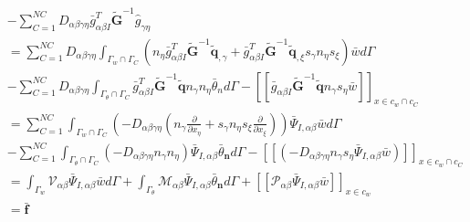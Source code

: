 \begin{equation}
 \begin{split}
    &-\sum_{C=1}^{N\!C}D_{\alpha\beta\gamma\eta}\bar{g}_{\alpha\beta I}^T\tilde{\pmb G}^{-1}\hat{g}_{\gamma\eta }\\
    &=\sum_{C=1}^{N\!C}D_{\alpha\beta\gamma\eta}\int_{{\Gamma_w}\cap{\Gamma_C}}(n_{\eta}
    \bar{g}_{\alpha\beta I}^T\tilde{\pmb G}^{-1}\tilde{\pmb q}_{,\gamma}+\bar{g}_{\alpha\beta I}^T
    \tilde{\pmb G}^{-1}\tilde{\pmb q}_{,\xi}s_{\gamma}n_{\eta}s_{\xi})\bar{w}d\Gamma\\
    &-\sum_{C=1}^{N\!C}D_{\alpha\beta\gamma\eta}\int_{{\Gamma_{\theta}}\cap{\Gamma_{C}}}\bar{g}^T_{\alpha\beta I}\tilde{\pmb G}^{-1}\tilde{\pmb q}n_{\gamma}n_{\eta}\bar{\theta}_nd\Gamma-[[\bar{g}_{\alpha\beta I}\tilde{\pmb G}^{-1}\tilde{\pmb q}n_{\gamma}s_{\eta}\bar{w}]]_{x\in{c_w}\cap{c_C}}\\
    &=\sum_{C=1}^{N\!C}\int_{{\Gamma_w}\cap{\Gamma_C}}(-D_{\alpha\beta\gamma\eta}(n_{\gamma}\frac{\partial}{\partial x_{\eta}}+s_{\gamma}n_{\eta}s_{\xi}\frac{\partial}{\partial x_{\xi}}))\bar{\Psi}_{I,\alpha\beta}\bar{w}d\Gamma\\
    &-\sum_{C=1}^{N\!C}\int_{{\Gamma_{\theta}}\cap{\Gamma_C}}(-D_{\alpha\beta\gamma\eta}n_{\gamma}n_{\eta})\bar{\Psi}_{I,\alpha\beta}\bar{\theta}_{\pmb n}d\Gamma-[[(-D_{\alpha\beta\gamma\eta}n_{\gamma}s_{\eta}\bar{\Psi}_{I,\alpha\beta}\bar{w})]]_{x\in{c_w}\cap{c_C}}\\
    &=\int_{\Gamma_w}\mathcal{V}_{\alpha\beta}\bar{\Psi}_{I,\alpha\beta}\bar{w}d\Gamma+\int_{\Gamma_{\theta}}\mathcal{M}_{\alpha\beta}\bar{\Psi}_{I,\alpha\beta}\bar{\theta}_{\pmb n}d\Gamma+[[\mathcal{P}_{\alpha\beta}\bar{\Psi}_{I,\alpha\beta}\bar{w}]]_{x\in{c_w}}\\
    &=\bar{\pmb f}
\end{split}
\end{equation}